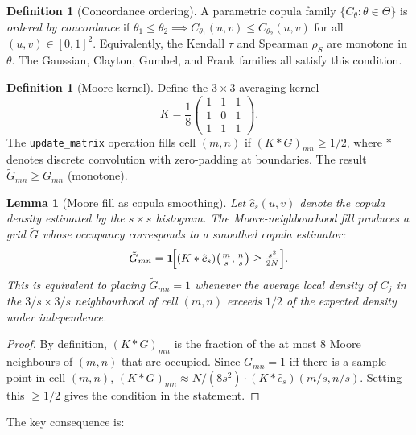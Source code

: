 \documentclass[11pt,a4paper]{article}
\newtheorem{lemma}[theorem]{Lemma}
\theoremstyle{definition}
\newtheorem{definition}[theorem]{Definition}
\newcommand{\Ind}{\mathbf{1}}
\begin{document}
\begin{definition}[Concordance ordering]
\label{def:concordance}
A parametric copula family $\{C_\theta : \theta \in \Theta\}$ is
\emph{ordered by concordance} if $\theta_1 \le \theta_2 \implies
C_{\theta_1}(u,v) \le C_{\theta_2}(u,v)$ for all $(u,v) \in [0,1]^2$.
Equivalently, the Kendall $\tau$ and Spearman $\rho_S$ are monotone in
$\theta$.  The Gaussian, Clayton, Gumbel, and Frank families all satisfy
this condition.
\end{definition}

\begin{definition}[Moore kernel]
Define the $3 \times 3$ averaging kernel
\[
  K = \frac{1}{8}\begin{pmatrix} 1 & 1 & 1 \\ 1 & 0 & 1 \\ 1 & 1 & 1 \end{pmatrix}.
\]
The \texttt{update\_matrix} operation fills cell $(m,n)$ if
$(K * G)_{mn} \ge 1/2$, where $*$ denotes discrete convolution with
zero-padding at boundaries.  The result $\tilde{G}_{mn} \ge G_{mn}$
(monotone).
\end{definition}

\begin{lemma}[Moore fill as copula smoothing]
\label{lem:moore}
Let $\hat{c}_s(u,v)$ denote the copula density estimated by the $s\times s$
histogram.  The Moore-neighbourhood fill produces a grid $\tilde{G}$
whose occupancy corresponds to a \emph{smoothed} copula estimator:
\[
  \tilde{G}_{mn} = \Ind\!\Bigl[(K * \hat{c}_s)\!\left(\tfrac{m}{s}, \tfrac{n}{s}\right)
                    \ge \tfrac{s^2}{2N}\Bigr].
\]
This is equivalent to placing $\tilde{G}_{mn} = 1$ whenever the average
local density of $C_j$ in the $3/s \times 3/s$ neighbourhood of cell
$(m,n)$ exceeds $1/2$ of the expected density under independence.
\end{lemma}

\begin{proof}
By definition, $(K * G)_{mn}$ is the fraction of the at most 8 Moore
neighbours of $(m,n)$ that are occupied.  Since $G_{mn} = 1$ iff there is
a sample point in cell $(m,n)$, $(K * G)_{mn} \approx N/(8s^2) \cdot
(K * \hat{c}_s)(m/s, n/s)$.  Setting this $\ge 1/2$ gives the condition in
the statement.
\end{proof}

The key consequence is:
\end{document}
